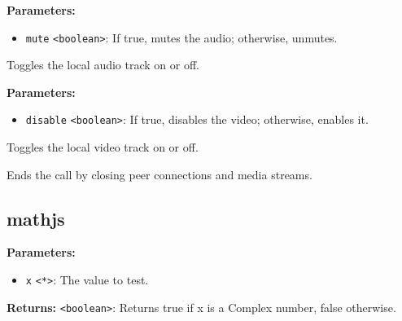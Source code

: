 \documentclass[12pt,a4paper]{article}
\begin{document}
\vspace{5mm}
\noindent {}


\noindent \textbf{Parameters:}
\begin{itemize}
  \item \texttt{mute} \texttt{<boolean>}: If true, mutes the audio; otherwise, unmutes.
\end{itemize}

\noindent Toggles the local audio track on or off.

\vspace{5mm}
\noindent {}


\noindent \textbf{Parameters:}
\begin{itemize}
  \item \texttt{disable} \texttt{<boolean>}: If true, disables the video; otherwise, enables it.
\end{itemize}

\noindent Toggles the local video track on or off.

\vspace{5mm}
\noindent {}


\noindent Ends the call by closing peer connections and media streams.


\subsection{mathjs}
\vspace{5mm}
\noindent {}


\noindent \textbf{Parameters:}
\begin{itemize}
  \item \texttt{x} \texttt{<*>}: The value to test.
\end{itemize}

\noindent \textbf{Returns:} \texttt{<boolean>}: Returns true if \textasciigrave{}x\textasciigrave{} is a Complex number, false otherwise.
\end{document}
